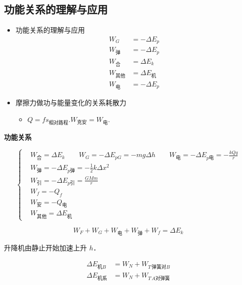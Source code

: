 \subsection{功能关系的理解与应用}
\begin{itemize}
\item 功能关系的理解与应用
  \begin{align*}
  W_{G}&=-\Delta E_p \\ %
  W_{\text{弹}}&=-\Delta E_p \\
  W_{\text{合}}&=\Delta E_k \\
  W_{\text{其他}}&=\Delta E_{\text{机}} \\
  W_{\text{电}}&=-\Delta E_p
  \end{align*}
\item 摩擦力做功与能量变化的关系\quad 耗散力
  \begin{itemize}
  \item $Q=fs_{\text{相对路程}}$.\quad $W_{\text{克安}}=W_{\text{电}}$.
  \end{itemize}
\end{itemize}

\textbf{功能关系}

\[
\left\{\begin{aligned}
&W_{\text{合}}=\Delta E_k\qquad W_G=-\Delta E_{pG}=-mg\Delta h\qquad W_{\text{电}}=-\Delta E_{p\text{电}}=-\frac{kQq}{r}\\[6pt]
&W_{\text{弹}}=-\Delta E_{p\text{弹}}=-\frac12k\Delta x^2\\[6pt]
&W_{\text{引}}=-\Delta E_{p\text{引}}=\frac{GMm}{r} %
\\[6pt]
&W_f=-Q_f\\[6pt]
&W_{\text{安}}=-Q_{\text{电}}\\[6pt]
&W_{\text{其他}}=\Delta E_{\text{机}}
\end{aligned}\right.
\]

\[
W_F+W_G+W_{\text{电}}+W_{\text{弹}}+W_f=\Delta E_k
\]

\begin{problem}
升降机由静止开始加速上升 $h$．
\begin{solution}
\begin{align*}
\Delta E_{\text{机}B} &= W_N+W_{T\,\text{弹簧对}B}\\
\Delta E_{\text{机系}} &= W_N+W_{T\,A\text{对弹簧}}
\end{align*}
\end{solution}
\end{problem}


